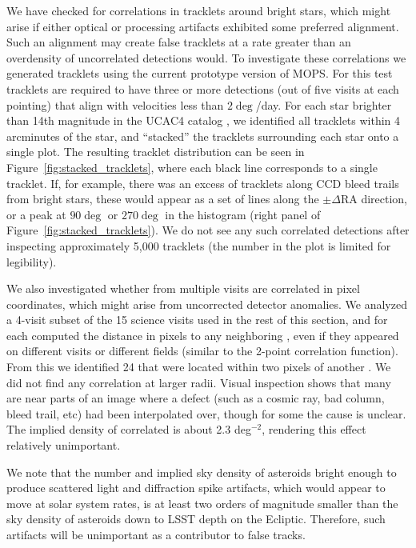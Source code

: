 We have checked for correlations in tracklets around bright stars, which
might arise if either optical or processing artifacts exhibited some preferred
alignment. Such an alignment may create false tracklets at a rate greater than
an overdensity of uncorrelated detections would. To investigate these
correlations we generated tracklets using the current prototype version of MOPS.
For this test tracklets are required to have three or more detections (out of five visits
at each pointing) that align with velocities less than $2\deg$/day. For each
star brighter than 14th magnitude in the UCAC4 catalog \citep{UCAC4}, we
identified all tracklets within 4 arcminutes of the star, and ``stacked'' the
tracklets surrounding each star onto a single plot. The resulting tracklet
distribution can be seen in Figure~\ref{fig:stacked_tracklets}, where each black
line corresponds to a single tracklet. If, for example, there was an excess of
tracklets along CCD bleed trails from bright stars, these would appear as a set
of lines along the $\pm\Delta \textrm{RA}$ direction, or a peak at $90\deg$ or
$270\deg$ in the histogram (right panel of Figure~\ref{fig:stacked_tracklets}).
We do not see any such correlated detections after inspecting approximately
5,000 tracklets (the number in the plot is limited for legibility).

We also investigated whether \DIASources from multiple visits are correlated
in pixel coordinates, which might arise from uncorrected detector anomalies.
We analyzed a 4-visit subset of the 15 science visits used in the rest of this
section, and for each \DIASource computed the distance in pixels to any neighboring
\DIASources, even if they appeared on different visits or different fields
(similar to the 2-point correlation function). From this we identified  24
\DIASources that were located within two pixels of another \DIASource. We did
not find any correlation at larger radii. Visual inspection shows that many are
near parts of an image where a defect (such as a cosmic ray, bad column, bleed
trail, etc) had been interpolated over, though for some the cause is unclear.
The implied density of correlated \DIASources is about 2.3 deg$^{-2}$, rendering
this effect relatively unimportant.

We note that the number and implied sky density of asteroids bright enough to produce
scattered light and diffraction spike artifacts, which would appear to move at solar system
rates, is at least two orders of magnitude smaller than the sky density of asteroids down
to LSST depth on the Ecliptic. Therefore, such artifacts will be unimportant as a contributor
to false tracks.
